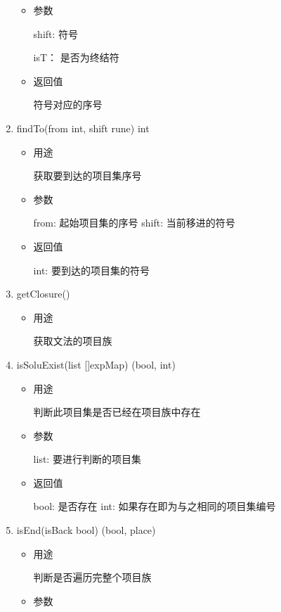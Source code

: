 \documentclass[fontset=none,UTF8,a4paper,zihao=-4]{ctexart}
\begin{document}
\begin{enumerate}
\begin{itemize}
\item 参数

shift: 符号

isT：  是否为终结符

\item 返回值

符号对应的序号
\end{itemize}

\item findTo(from int, shift rune) int

\begin{itemize}
\item 用途

获取要到达的项目集序号

\item 参数

from:  起始项目集的序号
shift: 当前移进的符号

\item 返回值

int: 要到达的项目集的符号
\end{itemize}

\item getClosure()

\begin{itemize}
\item 用途

获取文法的项目族
\end{itemize}

\item isSoluExist(list []expMap) (bool, int)

\begin{itemize}
\item 用途

判断此项目集是否已经在项目族中存在

\item 参数

list: 要进行判断的项目集

\item 返回值

bool: 是否存在
int:  如果存在即为与之相同的项目集编号
\end{itemize}

\item isEnd(isBack bool) (bool, place)

\begin{itemize}
\item 用途

判断是否遍历完整个项目族

\item 参数


\end{itemize}
\end{enumerate}
\end{document}
